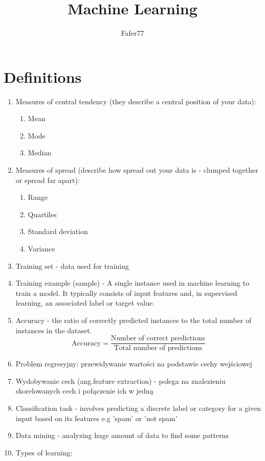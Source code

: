 \documentclass[polish,12pt,a4paper]{article}
\title{Machine Learning}
\author{Fafer77}
\begin{document}
	\maketitle
	\section{Definitions}
	\begin{enumerate}
		\item Measures of central tendency (they describe a central position of your data):
		\begin{enumerate}
			\item Mean
			\item Mode
			\item Median
		\end{enumerate}
		\item Measures of spread (describe how spread out your data is - clumped together or spread far apart):
		\begin{enumerate}
			\item Range
			\item Quartiles
			\item Standard deviation
			\item Variance
		\end{enumerate}
		\item Training set - data used for training
		\item Training example (sample) - A single instance used in machine learning to train a model. It typically consists of input features and, in supervised learning, an associated label or target value.
		\item Accuracy - the ratio of correctly predicted instances to the total number of instances in the dataset. 
		\[
		\text{Accuracy} = \frac{\text{Number of correct predictions}}{\text{Total number of predictions}}
		\]
		\item Problem regresyjny: przewidywanie wartości na podstawie cechy wejściowej
		\item Wydobywanie cech (ang.feature extraction) - polega na znalezieniu skorelowanych cech i połączenie ich w jedną
		\item Classification task - involves predicting a discrete label or category for a given input based on its features e.g 'spam' or 'not spam'
		\item Data mining - analyzing huge amount of data to find some patterns
		\item Types of learning:
		\begin{enumerate}

\end{enumerate}
\end{enumerate}
\end{document}
